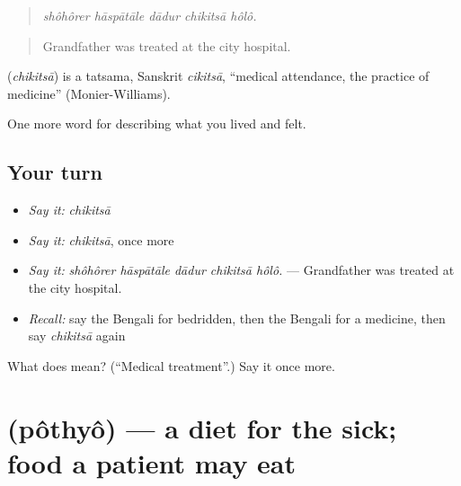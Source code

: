 \begin{quote}
    
\end{quote}

\begin{quote}
\emph{shôhôrer hāspātāle dādur chikitsā hôlô.}
\end{quote}

\begin{quote}
Grandfather was treated at the city hospital.
\end{quote}

\begin{cousinweb}
\textbf{} (\emph{chikitsā}) is a tatsama, Sanskrit \emph{cikitsā}, \textquotedblleft{}medical attendance, the practice of medicine\textquotedblright{} (Monier-Williams).
\end{cousinweb}

\begin{grammarlens}[title={What you've built}]
One more word for describing what you lived and felt.
\end{grammarlens}

\subsection*{Your turn}
\begin{itemize}
\raggedright
  \item \emph{Say it:} \emph{chikitsā}
  \item \emph{Say it:} \emph{chikitsā}, once more
  \item \emph{Say it:} \emph{shôhôrer hāspātāle dādur chikitsā hôlô.} — Grandfather was treated at the city hospital.
  \item \emph{Recall:} say the Bengali for bedridden, then the Bengali for a medicine, then say \emph{chikitsā} again
\end{itemize}

\begin{tcolorbox}[breakable,colback=teal!4,colframe=teal!35!black,title={Before you move on}]
What does  mean? (\textquotedblleft{}Medical treatment\textquotedblright{}.) Say it once more.
\end{tcolorbox}
\section[\texorpdfstring{\bn{পথ্য} (pôthyô)}{পথ্য (pôthyô)}]{ (pôthyô) — a diet for the sick; food a patient may eat}

